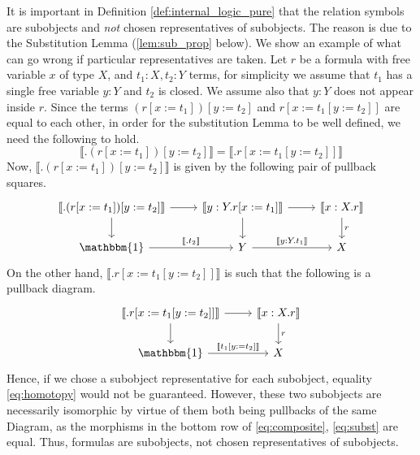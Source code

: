 \documentclass{tac}
\begin{document}
\begin{remark}
	It is important in Definition \ref{def:internal_logic_pure} that the relation symbols are subobjects and \emph{not} chosen representatives of subobjects. The reason is due to the Substitution Lemma (\ref{lem:sub_prop} below). We show an example of what can go wrong if particular representatives are taken. Let $r$ be a formula with free variable $x$ of type $X$, and $t_1:X,t_2:Y$ terms, for simplicity we assume that $t_1$ has a single free variable $y:Y$ and $t_2$ is closed. We assume also that $y:Y$ does not appear inside $r$. Since the terms $(r[x:= t_1])[y := t_2]$ and $r[x := t_1[y := t_2]]$ are equal to each other, in order for the substitution Lemma to be well defined, we need the following to hold.
	\begin{equation}\label{eq:homotopy}
	\llbracket . (r[x:= t_1])[y := t_2] \rrbracket = \llbracket .  r[x := t_1[y := t_2]]\rrbracket
	\end{equation}
Now, $\llbracket. (r[x:= t_1])[y := t_2] \rrbracket$ is given by the following pair of pullback squares.
\begin{equation}\label{eq:composite}
	\begin{tikzcd}
		\llbracket . (r[x:= t_1])[y := t_2] \rrbracket\arrow[d]\arrow[r] &  \llbracket y: Y. r[x := t_1] \rrbracket\arrow[d]\arrow[r] & \llbracket x:X. r \rrbracket\arrow[d,"r"]\\
		\mathbbm{1}\arrow[r,"{\llbracket . t_2 \rrbracket}"] & Y\arrow[r,"{\llbracket y:Y. t_1\rrbracket}"] & X
	\end{tikzcd}
\end{equation}
On the other hand, $\llbracket .r [x:= t_1[y:= t_2]]\rrbracket$ is such that the following is a pullback diagram.
\begin{equation}\label{eq:subst}
	\begin{tikzcd}
		\llbracket . r[x := t_1[y := t_2]]\rrbracket\arrow[d]\arrow[r] & \llbracket x:X. r\rrbracket\arrow[d,"{r}"]\\
		\mathbbm{1}\arrow[r,"{\llbracket t_1[y := t_2]\rrbracket}"] & X
	\end{tikzcd}
\end{equation}
Hence, if we chose a subobject representative for each subobject, equality \eqref{eq:homotopy} would not be guaranteed. However, these two subobjects are necessarily isomorphic by virtue of them both being pullbacks of the same Diagram, as the morphisms in the bottom row of \eqref{eq:composite}, \eqref{eq:subst} are equal. Thus, formulas are subobjects, not chosen representatives of subobjects.
\end{remark}
\end{document}
